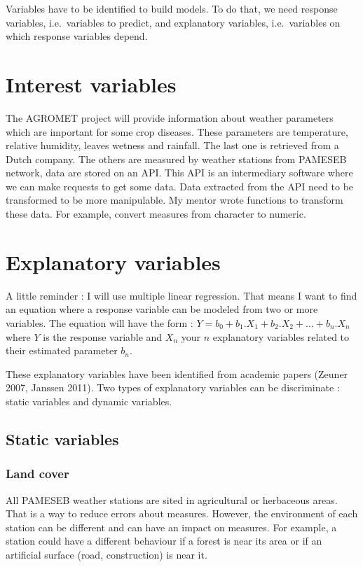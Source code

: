 \documentclass[12pt,twoside]{reedthesis}
\theoremstyle{definition}
\theoremstyle{definition}
\theoremstyle{definition}
\theoremstyle{remark}
\begin{document}
Variables have to be identified to build models. To do that, we need
response variables, i.e.~variables to predict, and explanatory
variables, i.e.~variables on which response variables depend.

\section{Interest variables}\label{interest-variables}

The AGROMET project will provide information about weather parameters
which are important for some crop diseases. These parameters are
temperature, relative humidity, leaves wetness and rainfall. The last
one is retrieved from a Dutch company. The others are measured by
weather stations from PAMESEB network, data are stored on an API. This
API is an intermediary software where we can make requests to get some
data. Data extracted from the API need to be transformed to be more
manipulable. My mentor wrote functions to transform these data. For
example, convert measures from character to numeric.

\section{Explanatory variables}\label{explanatory-variables}

A little reminder : I will use multiple linear regression. That means I
want to find an equation where a response variable can be modeled from
two or more variables. The equation will have the form :
\(Y = b_0 + b_1.X_1 + b_2.X_2 + ... + b_n.X_n\) where \(Y\) is the
response variable and \(X_n\) your \(n\) explanatory variables related
to their estimated parameter \(b_n\).

These explanatory variables have been identified from academic papers
(Zeuner 2007, Janssen 2011). Two types of explanatory variables can be
discriminate : static variables and dynamic variables.

\subsection{Static variables}\label{static-variables}

\subsubsection{Land cover}\label{land-cover}

All PAMESEB weather stations are sited in agricultural or herbaceous
areas. That is a way to reduce errors about measures. However, the
environment of each station can be different and can have an impact on
measures. For example, a station could have a different behaviour if a
forest is near its area or if an artificial surface (road, construction)
is near it.
\end{document}
